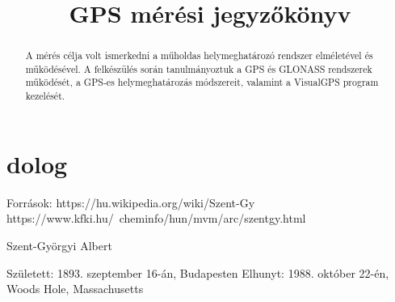 \documentclass[10pt, conference,a4paper]{ITKproc}
\begin{document}
\title{GPS mérési jegyzőkönyv}
\author{
}


\maketitle

\begin{abstract}
A mérés célja volt ismerkedni a műholdas helymeghatározó rendszer elméletével és működésével. A felkészülés során tanulmányoztuk a GPS és GLONASS rendszerek működését, a GPS-es helymeghatározás módszereit, valamint a VisualGPS program kezelését. 
\end{abstract}

\IEEEpeerreviewmaketitle
\section{dolog}
 	Források:
https://hu.wikipedia.org/wiki/Szent-Gy%
https://www.kfki.hu/~cheminfo/hun/mvm/arc/szentgy.html


Szent-Györgyi Albert

Született: 1893. szeptember 16-án, Budapesten
Elhunyt: 1988. október 22-én, Woods Hole, Massachusetts
\end{document}
